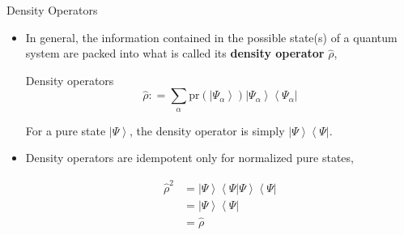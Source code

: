 \documentclass[9pt,handout]{beamer}
\newcommand{\pr}[0]{\text{pr}}
\begin{document}
\begin{frame}{Density Operators}
\begin{itemize}
\item In general, the information contained in the possible state(s) of a quantum system are packed into what is called its \textbf{density operator} $\widehat{\rho}$,

\begin{block}{Density operators}
$$\widehat{\rho} : = \sum_{\alpha} \pr \left( \left\lvert \Psi_\alpha \right\rangle \right) \left\lvert \Psi_\alpha \right\rangle \left\langle \Psi_\alpha \right\rvert$$
\end{block}

For a pure state $\left\lvert \Psi \right\rangle$, the density operator is simply $\left\lvert \Psi \right\rangle \left\langle \Psi \right\rvert$.

\item Density operators are idempotent only for normalized pure states,

\begin{align*}
\widehat{\rho}^2 & = \left\lvert \Psi \right\rangle \left\langle \Psi \right\rvert \left. \Psi \right\rangle \left\langle \Psi \right\rvert \\
& = \left\lvert \Psi \right\rangle \left\langle \Psi \right\rvert \\
& = \widehat{\rho}
\end{align*}
\end{itemize}
\end{frame}
\end{document}
